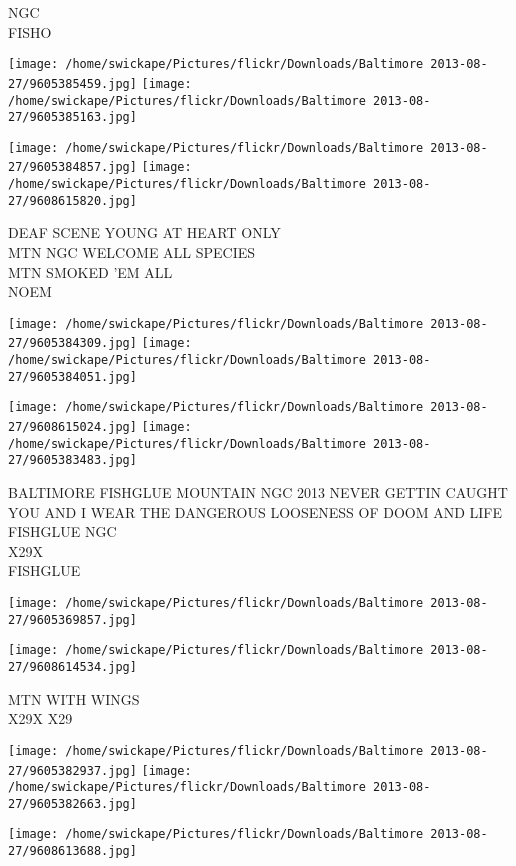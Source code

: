 \documentclass[10pt,letterpaper]{article}
\begin{document}
NGC\\
FISHO
\pagebreak

\texttt{[image: /home/swickape/Pictures/flickr/Downloads/Baltimore 2013-08-27/9605385459.jpg]}
\texttt{[image: /home/swickape/Pictures/flickr/Downloads/Baltimore 2013-08-27/9605385163.jpg]}

\texttt{[image: /home/swickape/Pictures/flickr/Downloads/Baltimore 2013-08-27/9605384857.jpg]}
\texttt{[image: /home/swickape/Pictures/flickr/Downloads/Baltimore 2013-08-27/9608615820.jpg]}

DEAF SCENE YOUNG AT HEART ONLY\\
MTN NGC WELCOME ALL SPECIES\\
MTN SMOKED 'EM ALL\\
NOEM
\pagebreak

\texttt{[image: /home/swickape/Pictures/flickr/Downloads/Baltimore 2013-08-27/9605384309.jpg]}
\texttt{[image: /home/swickape/Pictures/flickr/Downloads/Baltimore 2013-08-27/9605384051.jpg]}

\texttt{[image: /home/swickape/Pictures/flickr/Downloads/Baltimore 2013-08-27/9608615024.jpg]}
\texttt{[image: /home/swickape/Pictures/flickr/Downloads/Baltimore 2013-08-27/9605383483.jpg]}

BALTIMORE FISHGLUE MOUNTAIN NGC 2013 NEVER GETTIN CAUGHT\\
YOU AND I WEAR THE DANGEROUS LOOSENESS OF DOOM AND LIFE FISHGLUE NGC\\
X29X\\
FISHGLUE
\pagebreak

\texttt{[image: /home/swickape/Pictures/flickr/Downloads/Baltimore 2013-08-27/9605369857.jpg]}

\vspace{0.25in}
\texttt{[image: /home/swickape/Pictures/flickr/Downloads/Baltimore 2013-08-27/9608614534.jpg]}

MTN WITH WINGS\\
X29X X29
\pagebreak

\texttt{[image: /home/swickape/Pictures/flickr/Downloads/Baltimore 2013-08-27/9605382937.jpg]}
\texttt{[image: /home/swickape/Pictures/flickr/Downloads/Baltimore 2013-08-27/9605382663.jpg]}

\vspace{0.25in}
\texttt{[image: /home/swickape/Pictures/flickr/Downloads/Baltimore 2013-08-27/9608613688.jpg]}
\end{document}
